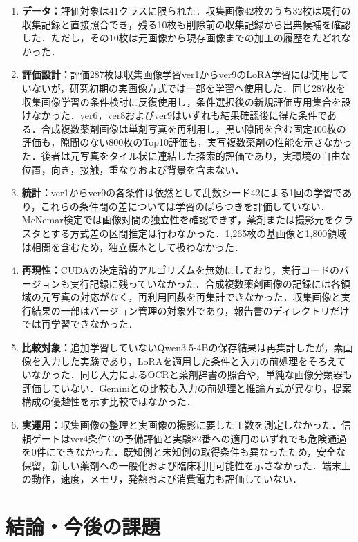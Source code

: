 \documentclass[uplatex,dvipdfmx]{jsarticle}
\begin{document}
{\small
\begin{enumerate}
\setlength{\itemsep}{0pt}
  \item \textbf{データ：}評価対象は41クラスに限られた．収集画像42枚のうち32枚は現行の収集記録と直接照合でき，残る10枚も削除前の収集記録から出典候補を確認した．ただし，その10枚は元画像から現存画像までの加工の履歴をたどれなかった．
  \item \textbf{評価設計：}評価287枚は収集画像学習ver1からver9のLoRA学習には使用していないが，研究初期の実画像方式では一部を学習へ使用した．同じ287枚を収集画像学習の条件検討に反復使用し，条件選択後の新規評価専用集合を設けなかった．ver6，ver8およびver9はいずれも結果確認後に得た条件である．合成複数薬剤画像は単剤写真を再利用し，黒い隙間を含む固定400枚の評価も，隙間のない800枚のTop10評価も，実写複数薬剤の性能を示さなかった．後者は元写真をタイル状に連結した探索的評価であり，実環境の自由な位置，向き，接触，重なりおよび背景を含まない．
  \item \textbf{統計：}ver1からver9の各条件は依然として乱数シード42による1回の学習であり，これらの条件間の差については学習のばらつきを評価していない．McNemar検定では画像対間の独立性を確認できず，薬剤または撮影元をクラスタとする方式差の区間推定は行わなかった．1,265枚の基画像と1,800領域は相関を含むため，独立標本として扱わなかった．
  \item \textbf{再現性：}CUDAの決定論的アルゴリズムを無効にしており，実行コードのバージョンも実行記録に残っていなかった．合成複数薬剤画像の記録には各領域の元写真の対応がなく，再利用回数を再集計できなかった．収集画像と実行結果の一部はバージョン管理の対象外であり，報告書のディレクトリだけでは再学習できなかった．
  \item \textbf{比較対象：}追加学習していないQwen3.5-4Bの保存結果は再集計したが，素画像を入力した実験であり，LoRAを適用した条件と入力の前処理をそろえていなかった．同じ入力によるOCRと薬剤辞書の照合や，単純な画像分類器も評価していない．Geminiとの比較も入力の前処理と推論方式が異なり，提案構成の優越性を示す比較ではなかった．
  \item \textbf{実運用：}収集画像の整理と実画像の撮影に要した工数を測定しなかった．信頼ゲートはver4条件Cの予備評価と実験82番への適用のいずれでも危険通過を0件にできなかった．既知側と未知側の取得条件も異なったため，安全な保留，新しい薬剤への一般化および臨床利用可能性を示さなかった．端末上の動作，速度，メモリ，発熱および消費電力も評価していない．
\end{enumerate}
}

\clearpage
\section{結論・今後の課題}\label{sec:conclusion}
\end{document}
